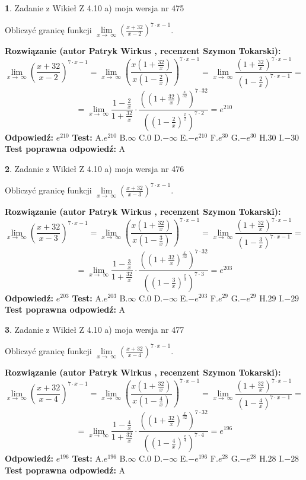 \documentclass[12pt, a4paper]{article}
\theoremstyle{definition} %
\newtheorem{zad}{}
\newcommand{\zadStart}[1]{\begin{zad}#1\newline}
\newcommand{\zadStop}{\end{zad}}
\newcommand{\rozwStart}[2]{\noindent \textbf{Rozwiązanie (autor #1 , recenzent #2): }\newline}
\newcommand{\rozwStop}{\newline}
\newcommand{\odpStart}{\noindent \textbf{Odpowiedź:}\newline}
\newcommand{\odpStop}{\newline}
\newcommand{\testStart}{\noindent \textbf{Test:}\newline}
\newcommand{\testStop}{\newline}
\newcommand{\kluczStart}{\noindent \textbf{Test poprawna odpowiedź:}\newline}
\newcommand{\kluczStop}{\newline}
\begin{document}
\zadStart{Zadanie z Wikieł Z 4.10 a) moja wersja nr 475}

Obliczyć granicę funkcji  $\lim\limits_{x\to\ \infty}(\frac{x+32}{x-2})^{7\cdot x-1}$.
\zadStop
\rozwStart{Patryk Wirkus}{Szymon Tokarski}
$$\lim\limits_{x\to\ \infty}(\frac{x+32}{x-2})^{7\cdot x-1} = \lim\limits_{x\to\ \infty}(\frac{x(1+\frac{32}{x})}{x(1-\frac{2}{x})})^{7\cdot x-1}=\lim\limits_{x\to\ \infty}\frac{(1+\frac{32}{x})^{7\cdot x-1}}{(1-\frac{2}{x})^{7\cdot x-1}}=$$
$$=\lim\limits_{x\to\ \infty}\frac{1-\frac{2}{x}}{1+\frac{32}{x}}\cdot\frac{((1+\frac{32}{x})^{\frac{x}{32}})^{7\cdot32}}{((1-\frac{2}{x})^{\frac{x}{2}})^{7\cdot2}}=e^{210}$$
\rozwStop
\odpStart
$e^{210}$
\odpStop
\testStart
A.$e^{210}$ B.$\infty$ C.$0$ D.$-\infty$ E.$-e^{210}$
F.$e^{30}$ G.$-e^{30}$
H.$30$
I.$-30$
\testStop
\kluczStart
A
\kluczStop



\zadStart{Zadanie z Wikieł Z 4.10 a) moja wersja nr 476}

Obliczyć granicę funkcji  $\lim\limits_{x\to\ \infty}(\frac{x+32}{x-3})^{7\cdot x-1}$.
\zadStop
\rozwStart{Patryk Wirkus}{Szymon Tokarski}
$$\lim\limits_{x\to\ \infty}(\frac{x+32}{x-3})^{7\cdot x-1} = \lim\limits_{x\to\ \infty}(\frac{x(1+\frac{32}{x})}{x(1-\frac{3}{x})})^{7\cdot x-1}=\lim\limits_{x\to\ \infty}\frac{(1+\frac{32}{x})^{7\cdot x-1}}{(1-\frac{3}{x})^{7\cdot x-1}}=$$
$$=\lim\limits_{x\to\ \infty}\frac{1-\frac{3}{x}}{1+\frac{32}{x}}\cdot\frac{((1+\frac{32}{x})^{\frac{x}{32}})^{7\cdot32}}{((1-\frac{3}{x})^{\frac{x}{3}})^{7\cdot3}}=e^{203}$$
\rozwStop
\odpStart
$e^{203}$
\odpStop
\testStart
A.$e^{203}$ B.$\infty$ C.$0$ D.$-\infty$ E.$-e^{203}$
F.$e^{29}$ G.$-e^{29}$
H.$29$
I.$-29$
\testStop
\kluczStart
A
\kluczStop



\zadStart{Zadanie z Wikieł Z 4.10 a) moja wersja nr 477}

Obliczyć granicę funkcji  $\lim\limits_{x\to\ \infty}(\frac{x+32}{x-4})^{7\cdot x-1}$.
\zadStop
\rozwStart{Patryk Wirkus}{Szymon Tokarski}
$$\lim\limits_{x\to\ \infty}(\frac{x+32}{x-4})^{7\cdot x-1} = \lim\limits_{x\to\ \infty}(\frac{x(1+\frac{32}{x})}{x(1-\frac{4}{x})})^{7\cdot x-1}=\lim\limits_{x\to\ \infty}\frac{(1+\frac{32}{x})^{7\cdot x-1}}{(1-\frac{4}{x})^{7\cdot x-1}}=$$
$$=\lim\limits_{x\to\ \infty}\frac{1-\frac{4}{x}}{1+\frac{32}{x}}\cdot\frac{((1+\frac{32}{x})^{\frac{x}{32}})^{7\cdot32}}{((1-\frac{4}{x})^{\frac{x}{4}})^{7\cdot4}}=e^{196}$$
\rozwStop
\odpStart
$e^{196}$
\odpStop
\testStart
A.$e^{196}$ B.$\infty$ C.$0$ D.$-\infty$ E.$-e^{196}$
F.$e^{28}$ G.$-e^{28}$
H.$28$
I.$-28$
\testStop
\kluczStart
A
\kluczStop
\end{document}

